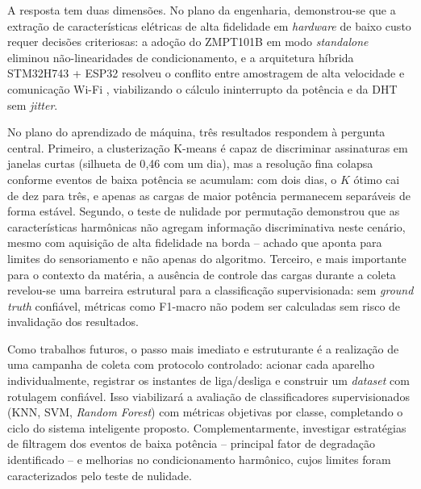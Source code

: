 \documentclass[12pt]{article}
\begin{document}
A resposta tem duas dimens\~oes. No plano da engenharia, demonstrou-se que a
extra\c{c}\~ao de caracter\'isticas el\'etricas de alta fidelidade em
\textit{hardware} de baixo custo requer decis\~oes criteriosas: a ado\c{c}\~ao
do ZMPT101B em modo \textit{standalone} eliminou n\~ao-linearidades de
condicionamento, e a arquitetura h\'ibrida STM32H743 + ESP32 resolveu o
conflito entre amostragem de alta velocidade e comunica\c{c}\~ao Wi-Fi
\citep{ref8}, viabilizando o c\'alculo ininterrupto da pot\^encia e da DHT
sem \textit{jitter}.

No plano do aprendizado de m\'aquina, tr\^es resultados respondem \`a pergunta
central. Primeiro, a clusteriza\c{c}\~ao K-means \'e capaz de discriminar
assinaturas em janelas curtas (silhueta de 0{,}46 com um dia), mas a
resolu\c{c}\~ao fina colapsa conforme eventos de baixa pot\^encia se acumulam:
com dois dias, o $K$ \'otimo cai de dez para tr\^es, e apenas as cargas de maior
pot\^encia permanecem separ\'aveis de forma est\'avel. Segundo, o teste de
nulidade por permuta\c{c}\~ao demonstrou que as caracter\'isticas harm\^onicas
n\~ao agregam informa\c{c}\~ao discriminativa neste cen\'ario, mesmo com aquisi\c{c}\~ao
de alta fidelidade na borda -- achado que aponta para limites do sensoriamento e
n\~ao apenas do algoritmo. Terceiro, e mais importante para o contexto da
mat\'eria, a aus\^encia de controle das cargas durante a coleta revelou-se uma
barreira estrutural para a classifica\c{c}\~ao supervisionada: sem
\textit{ground truth} confi\'avel, m\'etricas como F1-macro n\~ao podem ser
calculadas sem risco de invalida\c{c}\~ao dos resultados.

Como trabalhos futuros, o passo mais imediato e estruturante \'e a realiza\c{c}\~ao
de uma campanha de coleta com protocolo controlado: acionar cada aparelho
individualmente, registrar os instantes de liga/desliga e construir um
\textit{dataset} com rotulagem confi\'avel. Isso viabilizar\'a a avalia\c{c}\~ao
de classificadores supervisionados (KNN, SVM, \textit{Random Forest}) com
m\'etricas objetivas por classe, completando o ciclo do sistema inteligente
proposto. Complementarmente, investigar estrat\'egias de filtragem dos eventos de
baixa pot\^encia -- principal fator de degrada\c{c}\~ao identificado -- e melhorias
no condicionamento harm\^onico, cujos limites foram caracterizados pelo teste de
nulidade.


\end{document}

